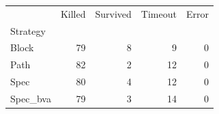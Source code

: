 \begin{tabular}{lrrrr}
\toprule
 & Killed & Survived & Timeout & Error \\
Strategy &  &  &  &  \\
\midrule
Block & 79 & 8 & 9 & 0 \\
Path & 82 & 2 & 12 & 0 \\
Spec & 80 & 4 & 12 & 0 \\
Spec_bva & 79 & 3 & 14 & 0 \\
\bottomrule
\end{tabular}
